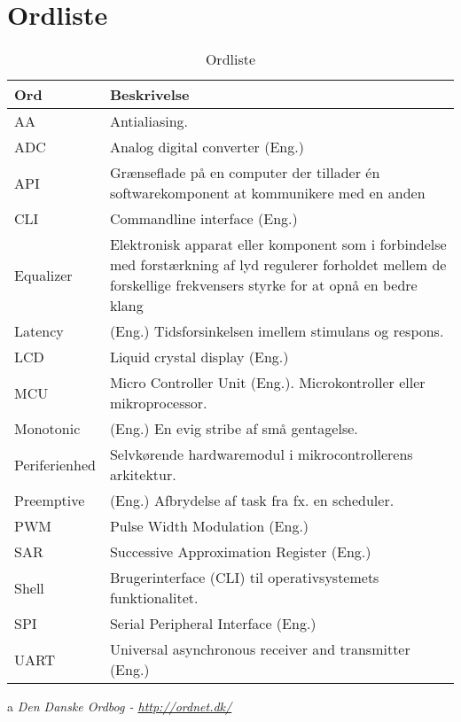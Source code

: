 \chapter{Ordliste} \label{bilag:ordliste}

\begin{table}[h!]
	\caption{Ordliste}
	\label{tab:ordliste}
	\begin{threeparttable}
		\begin{tabular}{l p{}}
			\toprule
			\textbf{Ord}      & \textbf{Beskrivelse}   \\ 
			\midrule
			AA			& Antialiasing.\\
			ADC			& Analog digital converter (Eng.)\\
			API			& Grænseflade på en computer der tillader én softwarekomponent at kommunikere med en anden\tnote{a}\\
			CLI			& Commandline interface (Eng.)\\
			Equalizer 	& Elektronisk apparat eller komponent som i forbindelse med forstærkning af lyd regulerer forholdet mellem de forskellige frekvensers styrke for at opnå en bedre klang \tnote{a} \\
			Latency		& (Eng.) Tidsforsinkelsen imellem stimulans og respons.\\ 
			LCD			& Liquid crystal display (Eng.) \\
			MCU       	& Micro Controller Unit (Eng.). Microkontroller eller mikroprocessor. \\
			Monotonic 	& (Eng.) En evig stribe af små gentagelse.  \tnote{a}\\
			Periferienhed & Selvkørende hardwaremodul i mikrocontrollerens arkitektur.\\
			Preemptive	& (Eng.) Afbrydelse af task fra fx. en scheduler.\\
			PWM			& Pulse Width Modulation (Eng.) \\
			SAR			& Successive Approximation Register (Eng.)\\
			Shell		& Brugerinterface (CLI) til operativsystemets funktionalitet.\\
			SPI			& Serial Peripheral Interface (Eng.)  \\
			UART		& Universal asynchronous receiver and transmitter (Eng.)\\
			\bottomrule
		\end{tabular}
	
		\begin{tablenotes}
			\item[a] \textit{Den Danske Ordbog - \url{http://ordnet.dk/}}
		\end{tablenotes}
	\end{threeparttable}
\end{table}
